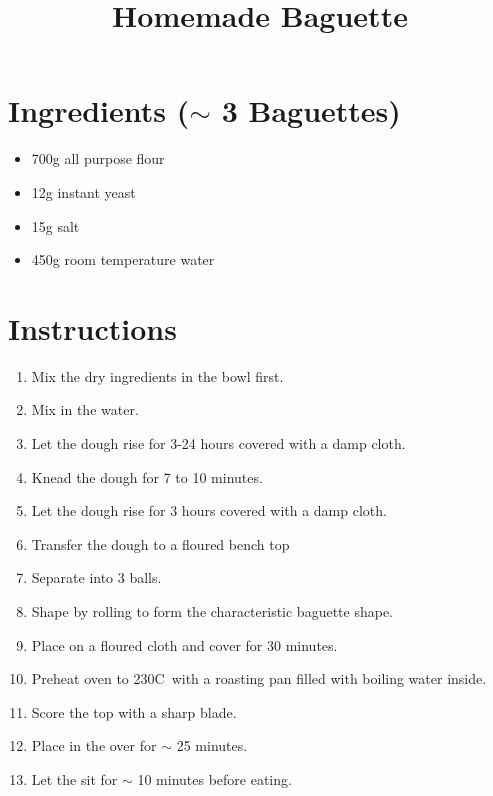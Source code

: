 \documentclass{article}
\title{Homemade Baguette}
\author{}
\date{}
\begin{document}
\maketitle


\section{Ingredients ($\sim$ 3 Baguettes)}

\begin{itemize}
    \item 700g all purpose flour
    \item 12g instant yeast
    \item 15g salt
    \item 450g room temperature water
\end{itemize}

\section{Instructions}

\begin{enumerate}
    \item Mix the dry ingredients in the bowl first.
    \item Mix in the water.
    \item Let the dough rise for 3-24 hours covered with a damp cloth.
    \item Knead the dough for 7 to 10 minutes.
    \item Let the dough rise for 3 hours covered with a damp cloth.
    \item Transfer the dough to a floured bench top
    \item Separate into 3 balls.
    \item Shape by rolling to form the characteristic baguette shape.
    \item Place on a floured cloth and cover for 30 minutes.
    \item Preheat oven to 230C\textdegree\ with a roasting pan filled with boiling water inside.
    \item Score the top with a sharp blade.
    \item Place in the over for $\sim$ 25 minutes.
    \item Let the sit for $\sim$ 10 minutes before eating.
\end{enumerate}
\end{document}

